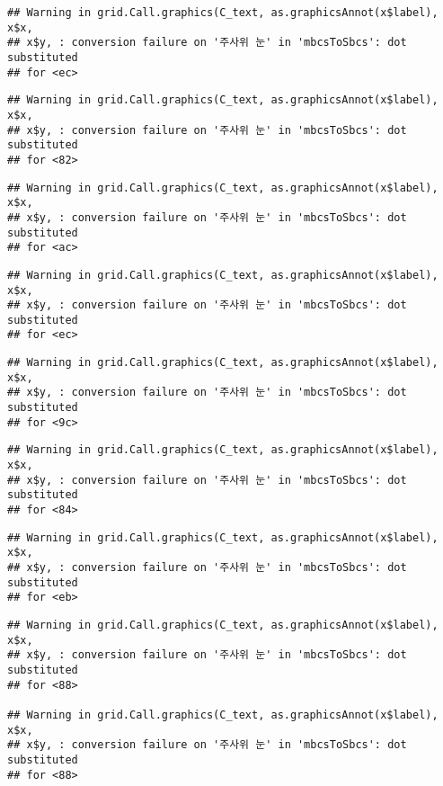 \documentclass[]{book}
\begin{document}
\begin{verbatim}
## Warning in grid.Call.graphics(C_text, as.graphicsAnnot(x$label), x$x,
## x$y, : conversion failure on '주사위 눈' in 'mbcsToSbcs': dot substituted
## for <ec>
\end{verbatim}

\begin{verbatim}
## Warning in grid.Call.graphics(C_text, as.graphicsAnnot(x$label), x$x,
## x$y, : conversion failure on '주사위 눈' in 'mbcsToSbcs': dot substituted
## for <82>
\end{verbatim}

\begin{verbatim}
## Warning in grid.Call.graphics(C_text, as.graphicsAnnot(x$label), x$x,
## x$y, : conversion failure on '주사위 눈' in 'mbcsToSbcs': dot substituted
## for <ac>
\end{verbatim}

\begin{verbatim}
## Warning in grid.Call.graphics(C_text, as.graphicsAnnot(x$label), x$x,
## x$y, : conversion failure on '주사위 눈' in 'mbcsToSbcs': dot substituted
## for <ec>
\end{verbatim}

\begin{verbatim}
## Warning in grid.Call.graphics(C_text, as.graphicsAnnot(x$label), x$x,
## x$y, : conversion failure on '주사위 눈' in 'mbcsToSbcs': dot substituted
## for <9c>
\end{verbatim}

\begin{verbatim}
## Warning in grid.Call.graphics(C_text, as.graphicsAnnot(x$label), x$x,
## x$y, : conversion failure on '주사위 눈' in 'mbcsToSbcs': dot substituted
## for <84>
\end{verbatim}

\begin{verbatim}
## Warning in grid.Call.graphics(C_text, as.graphicsAnnot(x$label), x$x,
## x$y, : conversion failure on '주사위 눈' in 'mbcsToSbcs': dot substituted
## for <eb>
\end{verbatim}

\begin{verbatim}
## Warning in grid.Call.graphics(C_text, as.graphicsAnnot(x$label), x$x,
## x$y, : conversion failure on '주사위 눈' in 'mbcsToSbcs': dot substituted
## for <88>

## Warning in grid.Call.graphics(C_text, as.graphicsAnnot(x$label), x$x,
## x$y, : conversion failure on '주사위 눈' in 'mbcsToSbcs': dot substituted
## for <88>
\end{verbatim}
\end{document}
